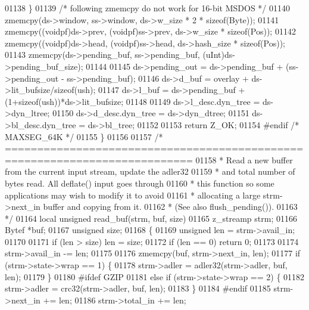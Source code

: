 \begin{DoxyCode}
{01138     \}
01139     \textcolor{comment}{/* following zmemcpy do not work for 16-bit MSDOS */}
01140     zmemcpy(ds->window, ss->window, ds->w\_size * 2 * \textcolor{keyword}{sizeof}(Byte));
01141     zmemcpy((voidpf)ds->prev, (voidpf)ss->prev, ds->w\_size * \textcolor{keyword}{sizeof}(Pos));
01142     zmemcpy((voidpf)ds->head, (voidpf)ss->head, ds->hash\_size * \textcolor{keyword}{sizeof}(Pos));
01143     zmemcpy(ds->pending\_buf, ss->pending\_buf, (uInt)ds->pending\_buf\_size);
01144 
01145     ds->pending\_out = ds->pending\_buf + (ss->pending\_out - ss->pending\_buf);
01146     ds->d\_buf = overlay + ds->lit\_bufsize/\textcolor{keyword}{sizeof}(ush);
01147     ds->l\_buf = ds->pending\_buf + (1+\textcolor{keyword}{sizeof}(ush))*ds->lit\_bufsize;
01148 
01149     ds->l\_desc.dyn\_tree = ds->dyn\_ltree;
01150     ds->d\_desc.dyn\_tree = ds->dyn\_dtree;
01151     ds->bl\_desc.dyn\_tree = ds->bl\_tree;
01152 
01153     \textcolor{keywordflow}{return} Z\_OK;
01154 \textcolor{preprocessor}{#endif }\textcolor{comment}{/* MAXSEG\_64K */}\textcolor{preprocessor}{}
01155 \}
01156 
01157 \textcolor{comment}{/* ===========================================================================}
01158 \textcolor{comment}{ * Read a new buffer from the current input stream, update the adler32}
01159 \textcolor{comment}{ * and total number of bytes read.  All deflate() input goes through}
01160 \textcolor{comment}{ * this function so some applications may wish to modify it to avoid}
01161 \textcolor{comment}{ * allocating a large strm->next\_in buffer and copying from it.}
01162 \textcolor{comment}{ * (See also flush\_pending()).}
01163 \textcolor{comment}{ */}
01164 local \textcolor{keywordtype}{unsigned} read\_buf(strm, buf, size)
01165     z\_streamp strm;
01166     Bytef *buf;
01167     \textcolor{keywordtype}{unsigned} size;
01168 \{
01169     \textcolor{keywordtype}{unsigned} len = strm->avail\_in;
01170 
01171     \textcolor{keywordflow}{if} (len > size) len = size;
01172     \textcolor{keywordflow}{if} (len == 0) \textcolor{keywordflow}{return} 0;
01173 
01174     strm->avail\_in  -= len;
01175 
01176     zmemcpy(buf, strm->next\_in, len);
01177     \textcolor{keywordflow}{if} (strm->state->wrap == 1) \{
01178         strm->adler = adler32(strm->adler, buf, len);
01179     \}
01180 \textcolor{preprocessor}{#ifdef GZIP}
01181     \textcolor{keywordflow}{else} \textcolor{keywordflow}{if} (strm->state->wrap == 2) \{
01182         strm->adler = crc32(strm->adler, buf, len);
01183     \}
01184 \textcolor{preprocessor}{#endif}
01185     strm->next\_in  += len;
01186     strm->total\_in += len;
}
\end{DoxyCode}
